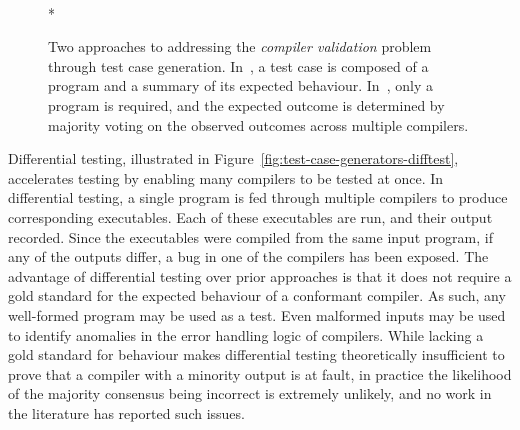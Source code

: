 \begin{figure}
  \centering
  \\*
  \caption[Generating and evaluating compiler test cases]{%
    Two approaches to addressing the \emph{compiler validation} problem through test case generation. In~\protect{}, a test case is composed of a program and a summary of its expected behaviour. In~\protect{}, only a program is required, and the expected outcome is determined by majority voting on the observed outcomes across multiple compilers.%
  }%
  \label{fig:test-case-generators}
\end{figure}

Differential testing, illustrated in Figure~\ref{fig:test-case-generators-difftest}, accelerates testing by enabling many compilers to be tested at once. In differential testing, a single program is fed through multiple compilers to produce corresponding executables. Each of these executables are run, and their output recorded. Since the executables were compiled from the same input program, if any of the outputs differ, a bug in one of the compilers has been exposed. The advantage of differential testing over prior approaches is that it does not require a gold standard for the expected behaviour of a conformant compiler. As such, any well-formed program may be used as a test. Even malformed inputs may be used to identify anomalies in the error handling logic of compilers. While lacking a gold standard for behaviour makes differential testing theoretically insufficient to prove that a compiler with a minority output is at fault, in practice the likelihood of the majority consensus being incorrect is extremely unlikely, and no work in the literature has reported such issues.

